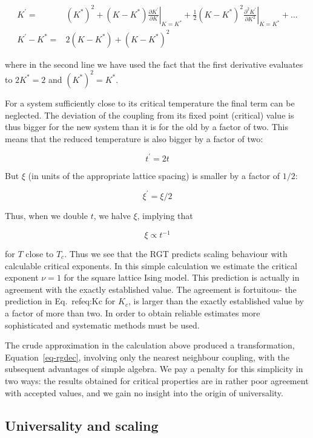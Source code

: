 \documentclass[
  letterpaper,
  enabledeprecatedfontcommands]{report}
\begin{document}
\begin{tcolorbox}
\[
\begin{aligned}
K^\prime =& (K^*)^2 +(K-K^*)\left.\frac{\partial K^\prime}{\partial K}\right|_{K=K^*}+\frac{1}{2}(K-K^*)^2\left.\frac{\partial^2 K^\prime}{\partial K^2}\right|_{K=K^*}+\ldots\nonumber\\
K^\prime - K^* =& 2 (K - K^*)+ (K - K^*)^2 
\end{aligned}
\]

where in the second line we have used the fact that the first derivative
evaluates to \(2K^*=2\) and \((K^*)^2=K^*\).

For a system sufficiently close to its critical temperature the final
term can be neglected. The deviation of the coupling from its fixed
point (critical) value is thus bigger for the new system than it is for
the old by a factor of two. This means that the reduced temperature is
also bigger by a factor of two:

\[t^\prime= 2t\]

But \(\xi\) (in units of the appropriate lattice spacing) is smaller by
a factor of \(1/2\):

\[\xi^\prime= \xi/2\]

Thus, when we double \(t\), we halve \(\xi\), implying that

\[\xi\propto t^{-1}\]

for \(T\) close to \(T_c\). Thus we see that the RGT predicts scaling
behaviour with calculable critical exponents. In this simple calculation
we estimate the critical exponent \(\nu=1\) for the square lattice Ising
model. This prediction is actually in agreement with the exactly
established value. The agreement is fortuitous- the prediction in
Eq.~refeq:Kc for \(K_c\), is larger than the exactly established value
by a factor of more than two. In order to obtain reliable estimates more
sophisticated and systematic methods must be used.

The crude approximation in the calculation above produced a
transformation, Equation~\ref{eq-rgdec}, involving only the nearest
neighbour coupling, with the subsequent advantages of simple algebra. We
pay a penalty for this simplicity in two ways: the results obtained for
critical properties are in rather poor agreement with accepted values,
and we gain no insight into the origin of universality.

\subsection{Universality and scaling}\label{universality-and-scaling-1}


\end{tcolorbox}
\end{document}
